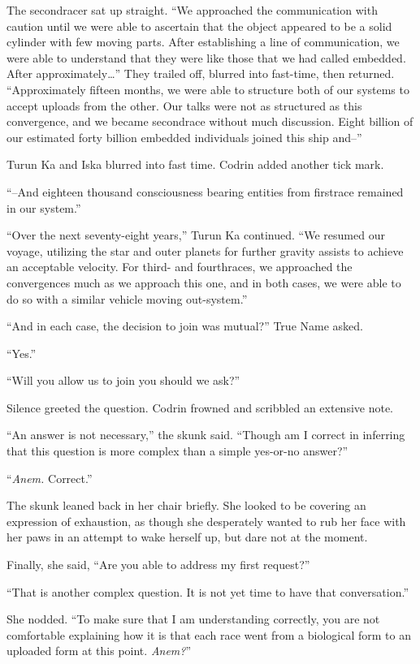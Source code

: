 The secondracer sat up straight. ``We approached the communication with caution until we were able to ascertain that the object appeared to be a solid cylinder with few moving parts. After establishing a line of communication, we were able to understand that they were like those that we had called embedded. After approximately\ldots{}'' They trailed off, blurred into fast-time, then returned. ``Approximately fifteen months, we were able to structure both of our systems to accept uploads from the other. Our talks were not as structured as this convergence, and we became secondrace without much discussion. Eight billion of our estimated forty billion embedded individuals joined this ship and--''

Turun Ka and Iska blurred into fast time. Codrin added another tick mark.

``--And eighteen thousand consciousness bearing entities from firstrace remained in our system.''

``Over the next seventy-eight years,'' Turun Ka continued. ``We resumed our voyage, utilizing the star and outer planets for further gravity assists to achieve an acceptable velocity. For third- and fourthraces, we approached the convergences much as we approach this one, and in both cases, we were able to do so with a similar vehicle moving out-system.''

``And in each case, the decision to join was mutual?'' True Name asked.

``Yes.''

``Will you allow us to join you should we ask?''

Silence greeted the question. Codrin frowned and scribbled an extensive note.

``An answer is not necessary,'' the skunk said. ``Though am I correct in inferring that this question is more complex than a simple yes-or-no answer?''

``\emph{Anem.} Correct.''

The skunk leaned back in her chair briefly. She looked to be covering an expression of exhaustion, as though she desperately wanted to rub her face with her paws in an attempt to wake herself up, but dare not at the moment.

Finally, she said, ``Are you able to address my first request?''

``That is another complex question. It is not yet time to have that conversation.''

She nodded. ``To make sure that I am understanding correctly, you are not comfortable explaining how it is that each race went from a biological form to an uploaded form at this point. \emph{Anem?}''

